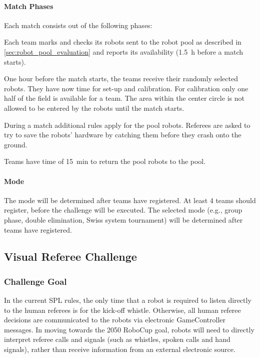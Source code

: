         \paragraph{Match Phases}
            Each match consists out of the following phases:
            \begin{description}[leftmargin=0.5cm,labelindent=0.5cm]
                \item[Robot check] Each team marks and checks its robots sent to the robot pool as described in \cref{sec:robot_pool_evaluation} and reports its availability (\qty{1.5}{\hour} before a match starts).
                \item[Setup] One hour before the match starts, the teams receive their randomly selected robots. They have now time for set-up and calibration. For calibration only one half of the field is available for a team. The area within the center circle is not allowed to be entered by the robots until the match starts.

                \item[Game] During a match additional rules apply for the pool robots. Referees are asked to try to save the robots' hardware by catching them before they crash onto the ground.
                \item[After game] Teams have time of \qty{15}{\minute} to return the pool robots to the pool.
            \end{description}

        \paragraph{Mode}
            The mode will be determined after teams have registered. At least 4 teams should register, before the challenge will be executed. The selected mode (e.g., group phase, double elimination, Swiss system tournament) will be determined after teams have registered.

\newpage

\subsection{Visual Referee Challenge}

    \subsubsection{Challenge Goal}

        In the current SPL rules, the only time that a robot is required to listen directly to the human referees is for the kick-off whistle. Otherwise, all human referee decisions are communicated to the robots via electronic GameController messages. In moving towards the 2050 RoboCup goal, robots will need to directly interpret referee calls and signals (such as whistles, spoken calls and hand signals), rather than receive information from an external electronic source.
        
